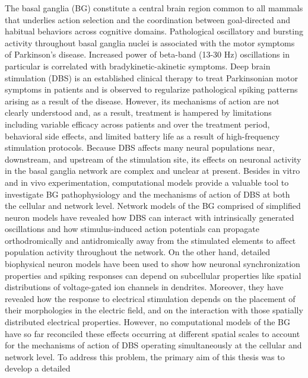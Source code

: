 %
%
%
%
%
%
%
%
%
%
%

%


The basal ganglia (BG) constitute a central brain region common to all mammals that
underlies action selection and the coordination between goal-directed and habitual
behaviors across cognitive domains. Pathological oscillatory and bursting activity
throughout basal ganglia nuclei is associated with the motor symptoms of Parkinson’s
disease. Increased power of beta-band (13-30 Hz) oscillations in particular is correlated
with bradykinetic-akinetic symptoms. Deep brain stimulation (DBS) is
an established clinical therapy to treat Parkinsonian motor symptoms in patients
and is observed to regularize pathological spiking patterns arising as a result of the disease.
%
However, its mechanisms of action are not clearly understood and, as a result, 
treatment is hampered by limitations including variable efficacy across patients
and over the treatment period, behavioral side effects, and limited battery life
as a result of high-frequency stimulation protocols.
%
%
%
%
%
%
%
%
%
%
%
%
Because DBS affects many neural populations near, downstream, and
upstream of the stimulation site, its effects on neuronal activity in the basal ganglia
network are complex and unclear at present. Besides in vitro and in vivo experimentation,
computational models provide a valuable tool to investigate BG pathophysiology
and the mechanisms of action of DBS at both the cellular and network level.
Network models of the BG comprised of simplified neuron models have revealed how 
DBS can interact with intrinsically generated oscillations and how stimulus-induced
action potentials can propagate orthodromically and antidromically away from the
stimulated elements to affect population activity throughout the network.
On the other hand, detailed biophysical neuron models have been used to show 
how neuronal synchronization properties and spiking responses can depend on
subcellular properties like spatial distributions of voltage-gated ion channels
in dendrites. Moreover, they have revealed how the response to electrical stimulation
depends on the placement of their morphologies in the electric field, and on the 
interaction with those spatially distributed electrical properties.
However, no computational models of the BG have so far reconciled these effects
occurring at different spatial scales to account for the mechanisms of action
of DBS operating simultaneously at the cellular and network level.
%
%
%
To address this problem, the primary aim of this thesis was to develop a detailed
